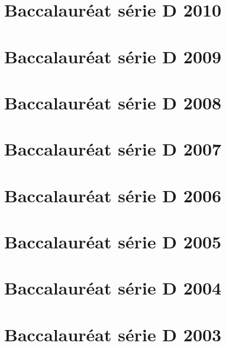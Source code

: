 \begin{corrige}
\section{Baccalauréat série D 2010}
{\color{loko2}}

\section{Baccalauréat série D 2009}
{\color{loko2}}

\section{Baccalauréat série D 2008}
{\color{loko2}}

\section{Baccalauréat série D 2007}
{\color{loko2}}

\section{Baccalauréat série D 2006}
{\color{loko2}}

\section{Baccalauréat série D 2005}
{\color{loko2}}

\section{Baccalauréat série D 2004}
{\color{loko2}}

\section{Baccalauréat série D 2003}
{\color{loko2}}

\end{corrige}



\appendix


